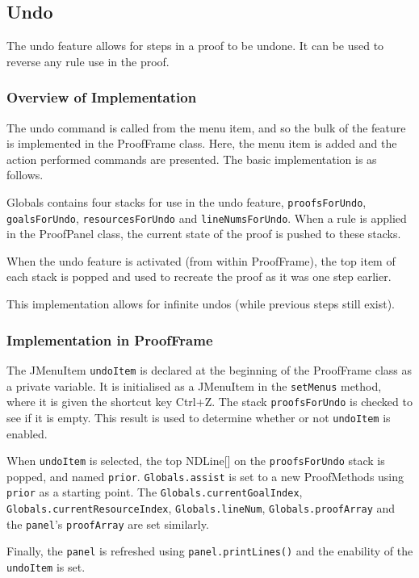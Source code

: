 \documentclass[a4paper]{article}
\begin{document}
\subsection{Undo}
The undo feature allows for steps in a proof to be undone. It can be used to reverse any rule use in the proof.

\subsubsection{Overview of Implementation}
The undo command is called from the menu item, and so the bulk of the feature is implemented in the ProofFrame class. Here, the menu item is added and the action performed commands are presented. The basic implementation is as follows.

Globals contains four stacks for use in the undo feature, \texttt{proofsForUndo}, \texttt{goalsForUndo}, \texttt{resourcesForUndo} and \texttt{lineNumsForUndo}. When a rule is applied in the ProofPanel class, the current state of the proof is pushed to these stacks.

When the undo feature is activated (from within ProofFrame), the top item of each stack is popped and used to recreate the proof as it was one step earlier.

This implementation allows for infinite undos (while previous steps still exist).

\subsubsection{Implementation in ProofFrame}
The JMenuItem \texttt{undoItem} is declared at the beginning of the ProofFrame class as a private variable. It is initialised as a JMenuItem in the \texttt{setMenus} method, where it is given the shortcut key Ctrl+Z. The stack \texttt{proofsForUndo} is checked to see if it is empty. This result is used to determine whether or not \texttt{undoItem} is enabled.

When \texttt{undoItem} is selected, the top NDLine[] on the \texttt{proofsForUndo} stack is popped, and named \texttt{prior}. \texttt{Globals.assist} is set to a new ProofMethods using \texttt{prior} as a starting point. The \texttt{Globals.currentGoalIndex}, \texttt{Globals.currentResourceIndex}, \texttt{Globals.lineNum}, \texttt{Globals.proofArray} and the \texttt{panel}'s \texttt{proofArray} are set similarly.

Finally, the \texttt{panel} is refreshed using \texttt{panel.printLines()} and the enability of the \texttt{undoItem} is set.
\end{document}
